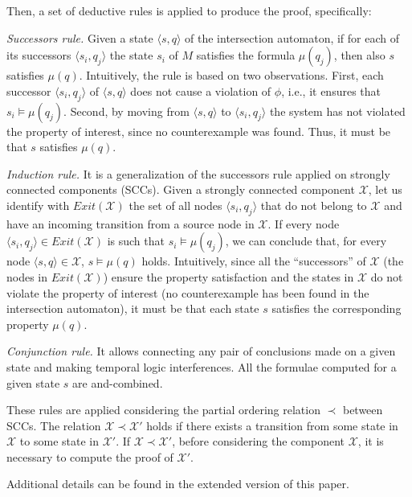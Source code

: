 Then, a set of deductive rules is applied to produce the proof, specifically:
\begin{enumerate*}
\item \emph{Successors rule.} Given a state $\langle s, q\rangle$ of the intersection automaton, if for each of its successors $\langle s_i, q_j\rangle$ the state $s_i$ of $M$ satisfies the formula $\mu(q_j)$, then also $s$ satisfies $\mu(q)$.
Intuitively, the rule is based on two observations.
First, each successor  $\langle s_i, q_j\rangle$ of  $\langle s, q\rangle$ does not cause a violation of $\phi$, i.e., it ensures that $s_i \models \mu(q_j)$.
Second, by moving from $\langle s, q\rangle$ to $\langle s_i, q_j\rangle$ the system has not violated the property of interest, since no counterexample was found.
Thus, it must be that $s$ satisfies $\mu(q)$.
\item \emph{Induction rule.} It is a generalization of the successors rule applied on strongly connected components (SCCs). 
Given a strongly connected component $\mathcal{X}$, let us identify with $Exit(\mathcal{X})$ the set of all nodes $\langle s_i, q_j\rangle$ that do not belong to $\mathcal{X}$ and have an incoming transition from a source node in $\mathcal{X}$.
If every node $\langle s_i, q_j\rangle \in Exit(\mathcal{X})$ is such that $s_i \models \mu(q_j)$, we can conclude that, for every node $\langle s, q \rangle \in \mathcal{X}$, $s \models \mu(q)$ holds.
Intuitively, since all the ``successors'' of $\mathcal{X}$ (the nodes in $Exit(\mathcal{X})$) ensure the property satisfaction and the states in $\mathcal{X}$ do not violate the property of interest (no counterexample has been found in the intersection automaton), it must be that each state $s$ satisfies the corresponding property $\mu(q)$. 
\item \emph{Conjunction rule.} It allows connecting any pair of conclusions made on a given state and making temporal logic interferences. 
All the formulae computed for a given state $s$ are and-combined.
\end{enumerate*}

These rules are applied considering the partial ordering relation $\prec$ between SCCs. 
The relation $\mathcal{X} \prec \mathcal{X}'$ holds if there exists a transition from some state in $\mathcal{X}$ to some state in $\mathcal{X}'$. 
If $\mathcal{X} \prec \mathcal{X}'$, before considering the component  $\mathcal{X}$, it is necessary to compute the proof of $\mathcal{X}'$.

Additional details can be found in the extended version of this paper.

